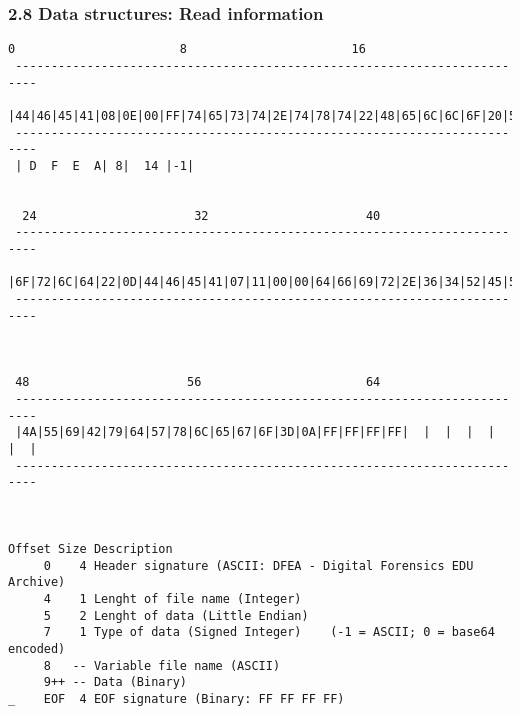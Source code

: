 \begin{frame}[fragile]
  \frametitle{2.8 Data structures: Read information}
\begin{lstlisting}[basicstyle=\tiny]
  0                       8                       16                      
 ------------------------------------------------------------------------- 
 |44|46|45|41|08|0E|00|FF|74|65|73|74|2E|74|78|74|22|48|65|6C|6C|6F|20|57|
 -------------------------------------------------------------------------
 | D  F  E  A| 8|  14 |-1|              


  24                      32                      40
 -------------------------------------------------------------------------
 |6F|72|6C|64|22|0D|44|46|45|41|07|11|00|00|64|66|69|72|2E|36|34|52|45|5A|
 -------------------------------------------------------------------------
                   


 48                      56                       64
 -------------------------------------------------------------------------
 |4A|55|69|42|79|64|57|78|6C|65|67|6F|3D|0A|FF|FF|FF|FF|  |  |  |  |  |  |
 -------------------------------------------------------------------------



Offset Size Description
     0    4 Header signature (ASCII: DFEA - Digital Forensics EDU Archive)
     4    1 Lenght of file name (Integer)
     5    2 Lenght of data (Little Endian)
     7    1 Type of data (Signed Integer)    (-1 = ASCII; 0 = base64 encoded)
     8   -- Variable file name (ASCII)
     9++ -- Data (Binary)
_    EOF  4 EOF signature (Binary: FF FF FF FF)
\end{lstlisting}
\end{frame}


